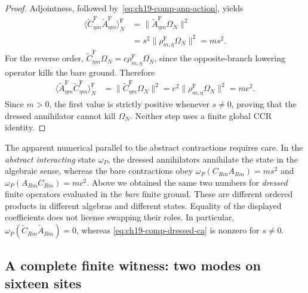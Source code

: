 \begin{proof}
Adjointness, followed by~\eqref{eq:ch19-comp-ann-action}, yields
\begin{align*}
 \bigl\langle\widetilde C_{\eta m}^{\mathrm F}
 \widetilde A_{\eta m}^{\mathrm F}\bigr\rangle_N^{\mathrm F}
 &=\bigl\|\widetilde A_{\eta m}^{\mathrm F}\Omega_N\bigr\|^2\\
 &=s^2\bigl\|\rho_{m,\bar\eta}^{\mathrm F}\Omega_N\bigr\|^2
 =m s^2.
\end{align*}
For the reverse order,
$\widetilde C_{\eta m}^{\mathrm F}\Omega_N
=c\rho_{m,\eta}^{\mathrm F}\Omega_N$, since the opposite-branch
lowering operator kills the bare ground.  Therefore
\begin{align*}
 \bigl\langle\widetilde A_{\eta m}^{\mathrm F}
 \widetilde C_{\eta m}^{\mathrm F}\bigr\rangle_N^{\mathrm F}
 &=\bigl\|\widetilde C_{\eta m}^{\mathrm F}\Omega_N\bigr\|^2
 =c^2\bigl\|\rho_{m,\eta}^{\mathrm F}\Omega_N\bigr\|^2
 =m c^2.
\end{align*}
Since $m>0$, the first value is strictly positive whenever
$s\ne0$, proving that the dressed annihilator cannot kill $\Omega_N$.
Neither step uses a finite global CCR identity.
\end{proof}

The apparent numerical parallel to the abstract contractions requires
care.  In the \emph{abstract interacting} state $\omega_P$, the dressed
annihilators annihilate the state in the algebraic sense, whereas the
bare contractions obey $\omega_P(C_{Rm}A_{Rm})=ms^2$ and
$\omega_P(A_{Rm}C_{Rm})=mc^2$.  Above we obtained the same two
numbers for \emph{dressed} finite operators evaluated in the
\emph{bare} finite ground.  These are different ordered products in
different algebras and different states.  Equality of the displayed
coefficients does not license swapping their roles.  In particular,
$\omega_P(\widetilde C_{Rm}\widetilde A_{Rm})=0$, whereas
\eqref{eq:ch19-comp-dressed-ca} is nonzero for $s\ne0$.

\subsection{A complete finite witness: two modes on sixteen sites}

